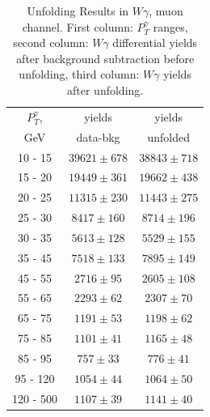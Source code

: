 \begin{table}[h]
  \scriptsize
  \begin{center}
  \caption{Unfolding Results in $W\gamma$, muon channel. First column: $P_T^{\gamma}$ ranges, second column: $W\gamma$ differential yields after background subtraction before unfolding, third column: $W\gamma$ yields after unfolding.}
  \begin{tabular}{|c|c|c|}

  $P_T^{\gamma}$, &  yields &   yields  \\ 
  GeV             &  data-bkg & unfolded  \\ \hline

 10 -  15 &     $39621\pm 678$ &     $38843\pm 718$  \\ \hline
 15 -  20 &     $19449\pm 361$ &     $19662\pm 438$  \\ \hline
 20 -  25 &     $11315\pm 230$ &     $11443\pm 275$  \\ \hline
 25 -  30 &     $8417\pm 160$ &     $8714\pm 196$  \\ \hline
 30 -  35 &     $5613\pm 128$ &     $5529\pm 155$  \\ \hline
 35 -  45 &     $7518\pm 133$ &     $7895\pm 149$  \\ \hline
 45 -  55 &     $2716\pm  95$ &     $2605\pm 108$  \\ \hline
 55 -  65 &     $2293\pm  62$ &     $2307\pm  70$  \\ \hline
 65 -  75 &     $1191\pm  53$ &     $1198\pm  62$  \\ \hline
 75 -  85 &     $1101\pm  41$ &     $1165\pm  48$  \\ \hline
 85 -  95 &     $757\pm  33$ &     $776\pm  41$  \\ \hline
 95 - 120 &     $1054\pm  44$ &     $1064\pm  50$  \\ \hline
120 - 500 &     $1107\pm  39$ &     $1141\pm  40$  \\ \hline
  \end{tabular}
  \label{tab:unf_results_MUON_WGamma}
  \end{center}
\end{table}

